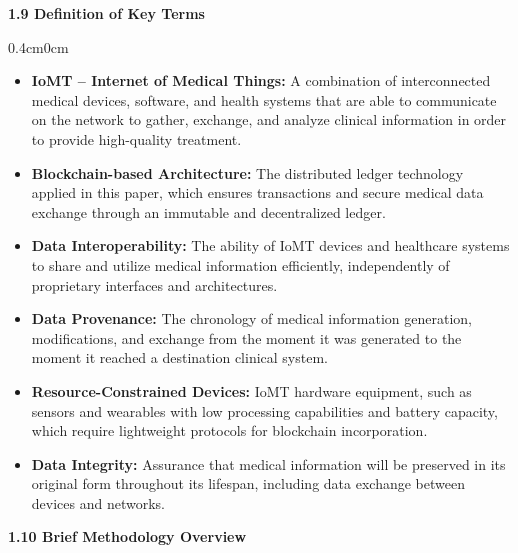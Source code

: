 \documentclass[12pt, a4paper]{report}
\begin{document}
\vspace{1cm}

{\color{myblue} \Large \bfseries 1.9 Definition of Key Terms}
\begin{adjustwidth}{0.4cm}{0cm}
    \begin{itemize}
    \item \textbf{IoMT – Internet of Medical Things:} A combination of interconnected medical devices, software, and health systems that are able to communicate on the network to gather, exchange, and analyze clinical information in order to provide high-quality treatment.
    \item \textbf{Blockchain-based Architecture:} The distributed ledger technology applied in this paper, which ensures transactions and secure medical data exchange through an immutable and decentralized ledger.
    \item \textbf{Data Interoperability:} The ability of IoMT devices and healthcare systems to share and utilize medical information efficiently, independently of proprietary interfaces and architectures.
    \item \textbf{Data Provenance: } The chronology of medical information generation, modifications, and exchange from the moment it was generated to the moment it reached a destination clinical system.
    \item \textbf{Resource-Constrained Devices:} IoMT hardware equipment, such as sensors and wearables with low processing capabilities and battery capacity, which require lightweight protocols for blockchain incorporation.
    \item \textbf{Data Integrity:} Assurance that medical information will be preserved in its original form throughout its lifespan, including data exchange between devices and networks.
\end{itemize}
\end{adjustwidth}

\vspace{0.5cm}
{\color{myblue} \Large \bfseries 1.10 Brief Methodology Overview}
\end{document}
